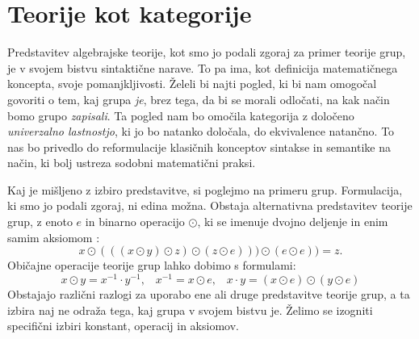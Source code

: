 \documentclass[../kategoricna_logika.tex]{subfiles}
\begin{document}
\section{Teorije kot kategorije}
\label{sec:teorije-kot-kategorije}
Predstavitev algebrajske teorije, kot smo jo podali zgoraj za primer
teorije grup, je v svojem bistvu sintaktične narave. To pa ima,
kot definicija matematičnega koncepta, svoje pomanjkljivosti.
Želeli bi najti pogled, ki bi nam omogočal govoriti o tem,
kaj grupa \emph{je}, brez tega, da bi se morali odločati,
na kak način bomo grupo \emph{zapisali}.
Ta pogled nam bo omočila kategorija z določeno \emph{univerzalno lastnostjo},
ki jo bo natanko določala, do ekvivalence natančno.
To nas bo privedlo do reformulacije klasičnih konceptov
sintakse in semantike na način, ki bolj ustreza sodobni matematični praksi.

Kaj je mišljeno z izbiro predstavitve, si poglejmo na primeru grup.
Formulacija, ki smo jo podali zgoraj, ni edina možna.
Obstaja alternativna predstavitev teorije grup,
z enoto $e$ in binarno operacijo $\odot$,
ki se imenuje dvojno deljenje in enim samim aksiomom \cite{mccune1993single}:
$$x \odot (((x \odot y ) \odot z ) \odot ( z \odot e))) \odot (e \odot e) ) = z.$$
Običajne operacije teorije grup lahko dobimo s formulami:
$$x \odot y = x^{-1} \cdot y^{-1} \text{,} \quad x^{-1} = x \odot e \text{,} \quad x \cdot y = (x \odot e) \odot (y \odot e)$$
%
Obstajajo različni razlogi za uporabo ene ali druge predstavitve
teorije grup, a ta izbira naj ne odraža tega, kaj grupa v svojem bistvu je.
Želimo se izogniti specifični izbiri konstant, operacij in aksiomov.
\end{document}
